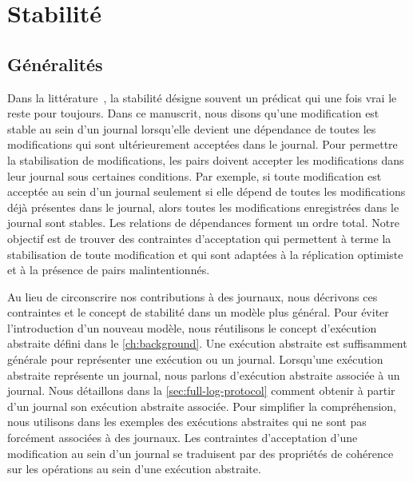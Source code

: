 \section{Stabilité}\label{sec:stability}

\subsection{Généralités}\label{subsec:general-stability}

Dans la littérature~\autocite{baquero_2018_pure-op-crdt, shapiro_2011_crdt,birman_1991_causalmulticast}, la stabilité désigne souvent un prédicat qui une fois vrai le reste pour toujours.
Dans ce manuscrit, nous disons qu'une modification est stable au sein d'un journal lorsqu'elle devient une dépendance de toutes les modifications qui sont ultérieurement acceptées dans le journal.
Pour permettre la stabilisation de modifications, les pairs doivent accepter les modifications dans leur journal sous certaines conditions.
Par exemple, si toute modification est acceptée au sein d'un journal seulement si elle dépend de toutes les modifications déjà présentes dans le journal, alors toutes les modifications enregistrées dans le journal sont stables.
Les relations de dépendances forment un ordre total.
Notre objectif est de trouver des contraintes d'acceptation qui permettent à terme la stabilisation de toute modification et qui sont adaptées à la réplication optimiste et à la présence de pairs malintentionnés.

Au lieu de circonscrire nos contributions à des journaux, nous décrivons ces contraintes et le concept de stabilité dans un modèle plus général.
Pour éviter l'introduction d'un nouveau modèle, nous réutilisons le concept d'exécution abstraite défini dans le \autoref{ch:background}.
Une exécution abstraite est suffisamment générale pour représenter une exécution ou un journal.
Lorsqu'une exécution abstraite représente un journal, nous parlons d'exécution abstraite associée à un journal.
Nous détaillons dans la \autoref{sec:full-log-protocol} comment obtenir à partir d'un journal son exécution abstraite associée.
Pour simplifier la compréhension, nous utilisons dans les exemples des exécutions abstraites qui ne sont pas forcément associées à des journaux.
Les contraintes d'acceptation d'une modification au sein d'un journal se traduisent par des propriétés de cohérence sur les opérations au sein d'une exécution abstraite.


